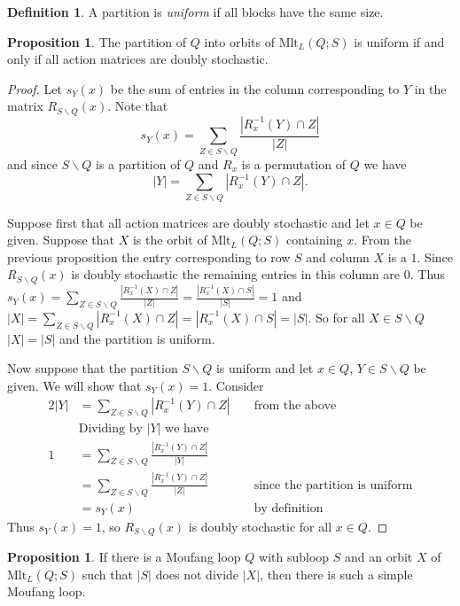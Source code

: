 \documentclass[12pt, twoside, openright]{report}
\theoremstyle{definition}
\newtheorem{prp}[thm]{Proposition}
\newtheorem{dfn}[thm]{Definition}
\newcommand{\ldv}{\backslash}       %
\newcommand{\mlt}{\text{Mlt}}       %
\begin{document}
\begin{dfn}
  A partition is \emph{uniform} if all blocks have the same size.
\end{dfn}

\begin{prp}
  The partition of $Q$ into orbits of $\mlt_L(Q; S)$ is uniform if and only if all action matrices are doubly stochastic.
\end{prp}

\begin{proof}
  Let $s_Y(x)$ be the sum of entries in the column corresponding to $Y$ in the matrix $R_{S\ldv Q}(x)$.
    Note that
  \[s_Y(x) = \sum_{Z\in S\ldv Q} \frac{|R_x^{-1}(Y)\cap Z|}{|Z|}\]
  and since $S\ldv Q$ is a partition of $Q$ and $R_x$ is a permutation of $Q$ we have
  \[|Y| = \sum_{Z\in S\ldv Q} |R_x^{-1}(Y)\cap Z|.\]

  Suppose first that all action matrices are doubly stochastic and let $x\in Q$ be given. Suppose that
    $X$ is the orbit of $\mlt_L(Q; S)$ containing $x$. From the previous proposition the entry
    corresponding to row $S$ and column $X$ is a $1$. Since $R_{S\ldv Q}(x)$ is doubly stochastic the
    remaining entries in this column are $0$. Thus
    $s_Y(x) = \sum_{Z\in S\ldv Q} \frac{|R_x^{-1}(X)\cap Z|}{|Z|} = \frac{|R_x^{-1}(X)\cap S|}{|S|} = 1$
    and $|X| = \sum_{Z\in S\ldv Q} |R_x^{-1}(X)\cap Z| = |R_x^{-1}(X)\cap S| = |S|$. So for all
    $X\in S\ldv Q$ $|X| = |S|$ and the partition is uniform.

  Now suppose that the partition $S\ldv Q$ is uniform and let $x\in Q$, $Y\in S\ldv Q$ be given. We will
    show that $s_Y(x) = 1$. Consider
  \begin{alignat*}{2}
    |Y| &= \sum_{Z\in S\ldv Q} |R_x^{-1}(Y)\cap Z| &&\text{ from the above}\\
    &\text{Dividing by $|Y|$ we have} &&\\
    1 &= \sum_{Z\in S\ldv Q} \frac{|R_x^{-1}(Y)\cap Z|}{|Y|} &&\\
    &= \sum_{Z\in S\ldv Q} \frac{|R_x^{-1}(Y)\cap Z|}{|Z|} &&\text{ since the partition is uniform}\\
    &= s_Y(x) &&\text{ by definition}
  \end{alignat*}
  Thus $s_Y(x) = 1$, so $R_{S\ldv Q}(x)$ is doubly stochastic for all $x\in Q$.
\end{proof}

\begin{prp}
  If there is a Moufang loop $Q$ with subloop $S$ and an orbit $X$ of $\mlt_L(Q; S)$ such that $|S|$
    does not divide $|X|$, then there is such a simple Moufang loop.
\end{prp}
\end{document}
